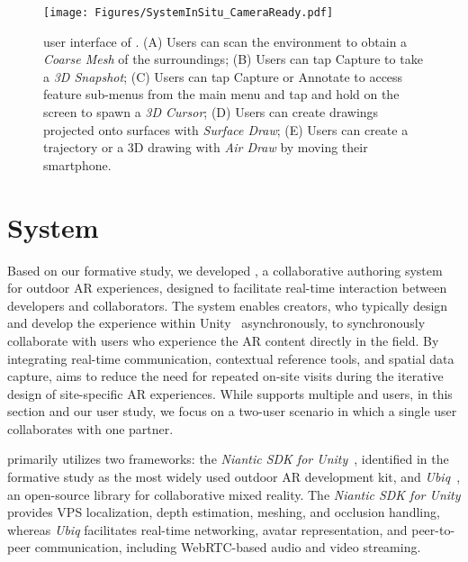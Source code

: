 
\begin{figure*}[ht!]
    \centering
    \texttt{[image: Figures/SystemInSitu\_CameraReady.pdf]}
    \caption{\Insitu user interface of \SystemName. \textsf{(A)} Users can scan the environment to obtain a \textit{Coarse Mesh} of the surroundings; \textsf{(B)} Users can tap \textsf{Capture} to take a \textit{3D Snapshot}; \textsf{(C)} Users can tap \textsf{Capture} or \textsf{Annotate} to access feature sub-menus from the main menu and tap and hold on the screen to spawn a \textit{3D Cursor}; \textsf{(D)} Users can create drawings projected onto surfaces with \textit{Surface Draw}; \textsf{(E)} Users can create a trajectory or a 3D drawing with \textit{Air Draw} by moving their smartphone.}
    \label{fig:insitu-system-overview}
\end{figure*}

\section{\SystemName System}\label{sec:system}
Based on our formative study, we developed \SystemName, a collaborative authoring system for outdoor AR experiences, designed to facilitate real-time interaction between \exsitu developers and \insitu collaborators. 
The system enables \exsitu creators, who typically design and develop the experience within Unity~\cite{unity} asynchronously, to synchronously collaborate with \insitu users who experience the AR content directly in the field. By integrating real-time communication, contextual reference tools, and spatial data capture, \SystemName aims to reduce the need for repeated on-site visits during the iterative design of site-specific AR experiences. While \SystemName supports multiple \exsitu and \insitu users, in this section and our user study, we focus on a two-user scenario in which a single \exsitu user collaborates with one \insitu partner.

\SystemName primarily utilizes two frameworks: the \textit{Niantic SDK for Unity}~\cite{lightship-ardk-niantic}, identified in the formative study as the most widely used outdoor AR development kit, and \textit{Ubiq}~\cite{fristonUbiqSystemBuild2021}, an open-source library for collaborative mixed reality. The \textit{Niantic SDK for Unity} provides VPS localization, depth estimation, meshing, and occlusion handling, whereas \textit{Ubiq} facilitates real-time networking, avatar representation, and peer-to-peer communication, including WebRTC-based audio and video streaming.

